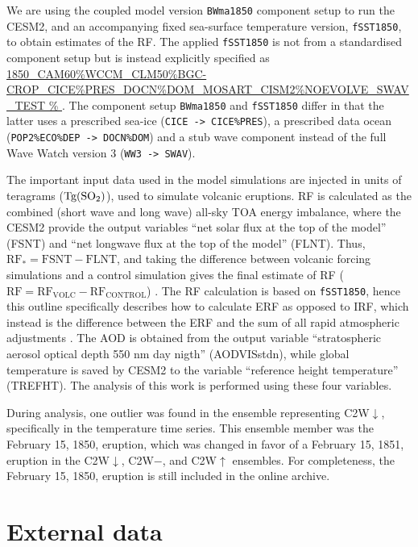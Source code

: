 \documentclass[draft]{agujournal2019}
\begin{document}
We are using the coupled model version \texttt{BWma1850} component setup to run the
CESM2, and an accompanying fixed sea-surface temperature version, \texttt{fSST1850}, to
obtain estimates of the RF. The applied \texttt{fSST1850} is not from a standardised
component setup but is instead explicitly specified as \url{1850_CAM60%
}. %
The component setup \texttt{BWma1850} and \texttt{fSST1850} differ in that the latter
uses a prescribed sea-ice (\texttt{CICE -> CICE\%PRES}), a prescribed data ocean
(\texttt{POP2\%ECO\%DEP -> DOCN\%DOM}) and a stub wave component instead of the full
Wave Watch version 3 (\texttt{WW3 -> SWAV}).

The important input data used in the model simulations are injected  in units of
teragrams (\(\si{\tera\gram(\ce{SO2})}\)), used to simulate volcanic eruptions. RF is
calculated as the combined (short wave and long wave) all-sky TOA energy imbalance,
where the CESM2 provide the output variables ``net solar flux at the top of the model''
(FSNT) and ``net longwave flux at the top of the model'' (FLNT). Thus, \(\mathrm{RF_*}=
\mathrm{FSNT} - \mathrm{FLNT}\), and taking the difference between volcanic forcing
simulations and a control simulation gives the final estimate of RF
(\(\mathrm{RF}=\mathrm{RF_{VOLC}}-\mathrm{RF_{CONTROL}}\)) \cite{marshall2020}. The RF
calculation is based on \texttt{fSST1850}, hence this outline specifically describes how
to calculate ERF as opposed to IRF, which instead is the difference between the ERF and
the sum of all rapid atmospheric adjustments \cite{marshall2020,smith2018}. The AOD is
obtained from the output variable ``stratospheric aerosol optical depth 550 nm day
nigth'' (AODVISstdn), while global temperature is saved by CESM2 to the variable
``reference height temperature'' (TREFHT). The analysis of this work is performed using
these four variables.

During analysis, one outlier was found in the ensemble representing C2W\(\downarrow\),
specifically in the temperature time series. This ensemble member was the February 15,
1850, eruption, which was changed in favor of a February 15, 1851, eruption in the
C2W\(\downarrow\), C2W\(-\), and C2W\(\uparrow\) ensembles. For completeness, the
February 15, 1850, eruption is still included in the online archive.

\section{External data}
\end{document}
